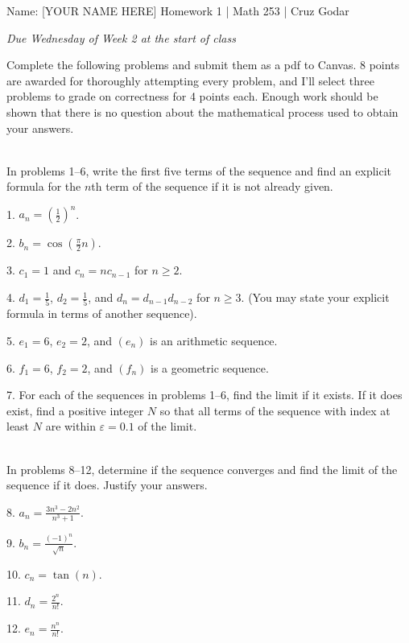\documentclass{article}
\begin{document}
\Large Name: [YOUR NAME HERE] \hfill Homework 1 | Math 253 | Cruz Godar \vspace{4pt} \normalsize

\textit{Due Wednesday of Week 2 at the start of class}

Complete the following problems and submit them as a pdf to Canvas. 8 points are awarded for thoroughly attempting every problem, and I'll select three problems to grade on correctness for 4 points each. Enough work should be shown that there is no question about the mathematical process used to obtain your answers. 

~\\

In problems 1--6, write the first five terms of the sequence and find an explicit formula for the $n$th term of the sequence if it is not already given.

1. $\displaystyle a_n = \left( \frac{1}{2} \right)^n$.

2. $\displaystyle b_n = \cos\left( \frac{\pi}{2} n \right)$.

3. $\displaystyle c_1 = 1$ and $\displaystyle c_n = nc_{n - 1}$ for $n \geq 2$.

4. $\displaystyle d_1 = \frac{1}{5}$, $\displaystyle d_2 = \frac{1}{5}$, and $d_n = d_{n - 1}d_{n - 2}$ for $n \geq 3$. (You may state your explicit formula in terms of another sequence).

5. $e_1 = 6$, $e_2 = 2$, and $(e_n)$ is an arithmetic sequence.

6. $f_1 = 6$, $f_2 = 2$, and $(f_n)$ is a geometric sequence.

7. For each of the sequences in problems 1--6, find the limit if it exists. If it does exist, find a positive integer $N$ so that all terms of the sequence with index at least $N$ are within $\varepsilon = 0.1$ of the limit.

~\\

In problems 8--12, determine if the sequence converges and find the limit of the sequence if it does. Justify your answers.

8. $\displaystyle a_n = \frac{3n^3 - 2n^2}{n^3 + 1}$.

9. $\displaystyle b_n = \frac{(-1)^n}{\sqrt{n}}$.

10. $\displaystyle c_n = \tan(n)$.

11. $\displaystyle d_n = \frac{2^n}{n!}$.

12. $\displaystyle e_n = \frac{n^n}{n!}$.
\end{document}
